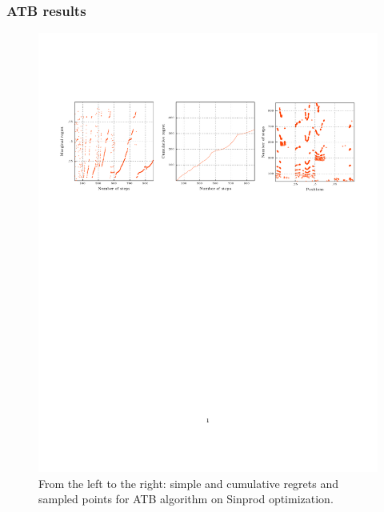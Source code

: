 \documentclass[xcolor={usenames,dvipsnames}]{beamer}
\begin{document}
\begin{frame}
\frametitle{ATB results}
\vspace{1cm}
\begin{figure}
\includegraphics[trim={1cm 6cm 1cm 4cm},clip,scale = 0.64]{ATB.pdf}
\vspace*{-7cm}
\caption{\label{fig:atb}From the left to the right: simple and cumulative regrets and sampled points for ATB algorithm on Sinprod optimization.}
\end{figure}
\end{frame}
\begin{frame}
	\small{

{}
\nocite{*}
}
\label{lastpage}
\end{frame}
\end{document}
